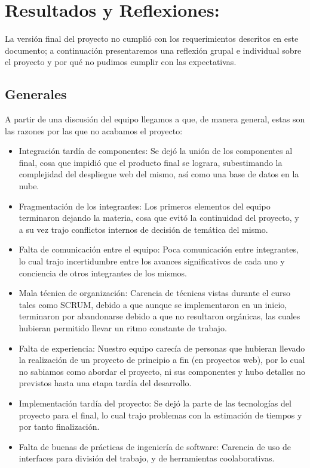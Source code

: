 \documentclass[12pt]{article}
\newcounter{ni}
\begin{document}
\begin{table}[H]
\begin{tabular}{|l|p{0.77\linewidth}|lll}
\end{tabular}
\end{table}

\section{Resultados y Reflexiones:}

La versión final del proyecto no cumplió con los requerimientos descritos en este documento; a continuación presentaremos una reflexión grupal e individual sobre el proyecto y por qué no pudimos cumplir con las expectativas.

\subsection{Generales}
A partir de una discusión del equipo llegamos a que, de manera general, estas son las razones por las que no acabamos el proyecto:

\begin{itemize}
    \item Integración tardía de componentes:
        Se dejó la unión de los componentes al final, cosa que impidió que el producto final se lograra, subestimando la complejidad del despliegue web del mismo, así como una base de datos en la nube.
    \item Fragmentación de los integrantes:
        Los primeros elementos del equipo terminaron dejando la materia, cosa que evitó la continuidad del proyecto, y a su vez trajo conflictos internos de decisión de temática del mismo.
    \item Falta de comunicación entre el equipo:
        Poca comunicación entre integrantes, lo cual trajo incertidumbre entre los avances significativos de cada uno y conciencia de otros integrantes de los mismos.
    \item Mala técnica de organización:
        Carencia de técnicas vistas durante el curso tales como SCRUM, debido a que aunque se implementaron en un inicio, terminaron por abandonarse debido a que no resultaron orgánicas, las cuales hubieran permitido llevar un ritmo constante de trabajo.
        
    \item Falta de experiencia:
        Nuestro equipo carecía de personas que hubieran llevado la realización de un proyecto de principio a fin (en proyectos web), por lo cual no sabiamos como abordar el proyecto, ni sus componentes y hubo detalles no previstos hasta una etapa tardía del desarrollo.
    \item Implementación tardía del proyecto:
        Se dejó la parte de las tecnologías del proyecto para el final, lo cual trajo problemas con la estimación de tiempos y por tanto finalización.
    \item Falta de buenas de prácticas de ingeniería de software:
        Carencia de uso de interfaces para división del trabajo, y de herramientas coolaborativas.
\end{itemize}
\end{document}
